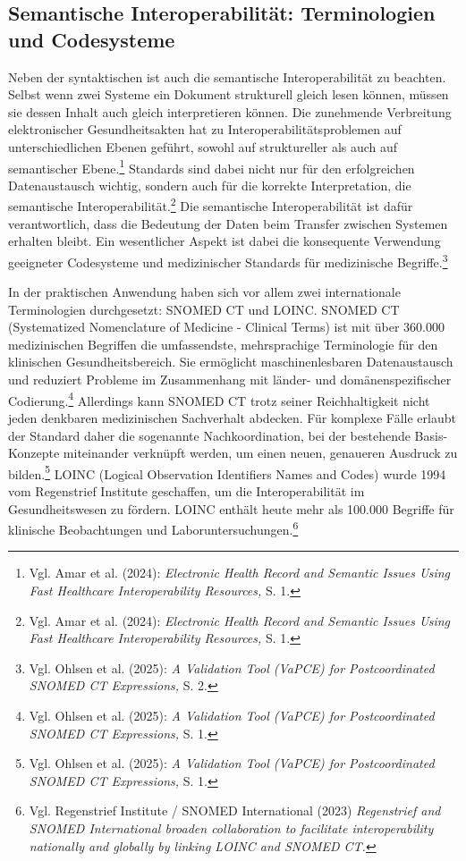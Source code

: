     \subsection{Semantische Interoperabilität: Terminologien und Codesysteme}
Neben der syntaktischen ist auch die semantische Interoperabilität zu beachten. Selbst wenn zwei Systeme ein Dokument strukturell gleich lesen können, müssen sie dessen Inhalt auch gleich interpretieren können. Die zunehmende Verbreitung elektronischer Gesundheitsakten hat zu Interoperabilitätsproblemen auf unterschiedlichen Ebenen geführt, sowohl auf struktureller als auch auf semantischer Ebene.\footnote{Vgl. Amar et al. (2024): \textit{Electronic Health Record and Semantic Issues Using Fast Healthcare Interoperability Resources,} S. 1.} Standards sind dabei nicht nur für den erfolgreichen Datenaustausch wichtig, sondern auch für die korrekte Interpretation, die semantische Interoperabilität.\footnote{Vgl. Amar et al. (2024):  \textit{Electronic Health Record and Semantic Issues Using Fast Healthcare Interoperability Resources,} S. 1.} Die semantische Interoperabilität ist dafür verantwortlich, dass die Bedeutung der Daten beim Transfer zwischen Systemen erhalten bleibt. Ein wesentlicher Aspekt ist dabei die konsequente Verwendung geeigneter Codesysteme und medizinischer Standards für medizinische Begriffe.\footnote{Vgl. Ohlsen et al. (2025):  \textit{A Validation Tool (VaPCE) for Postcoordinated SNOMED CT Expressions,} S. 2.}

In der praktischen Anwendung haben sich vor allem zwei internationale Terminologien durchgesetzt: SNOMED CT und LOINC. SNOMED CT (Systematized Nomenclature of Medicine - Clinical Terms) ist mit über 360.000 medizinischen Begriffen die umfassendste, mehrsprachige Terminologie für den klinischen Gesundheitsbereich. Sie ermöglicht maschinenlesbaren Datenaustausch und reduziert Probleme im Zusammenhang mit länder- und domänenspezifischer Codierung.\footnote{Vgl. Ohlsen et al. (2025):  \textit{A Validation Tool (VaPCE) for Postcoordinated SNOMED CT Expressions,} S. 1.} Allerdings kann SNOMED CT trotz seiner Reichhaltigkeit nicht jeden denkbaren medizinischen Sachverhalt abdecken. Für komplexe Fälle erlaubt der Standard daher die sogenannte Nachkoordination, bei der bestehende Basis-Konzepte miteinander verknüpft werden, um einen neuen, genaueren Ausdruck zu bilden.\footnote{Vgl. Ohlsen et al. (2025):  \textit{A Validation Tool (VaPCE) for Postcoordinated SNOMED CT Expressions,} S. 1.} LOINC (Logical Observation Identifiers Names and Codes) wurde 1994 vom Regenstrief Institute geschaffen, um die Interoperabilität im Gesundheitswesen zu fördern. LOINC enthält heute mehr als 100.000 Begriffe für klinische Beobachtungen und Laboruntersuchungen.\footnote{Vgl. Regenstrief Institute / SNOMED International (2023) \textit{Regenstrief and SNOMED International broaden collaboration to facilitate interoperability nationally and globally by linking LOINC and SNOMED CT.}}

